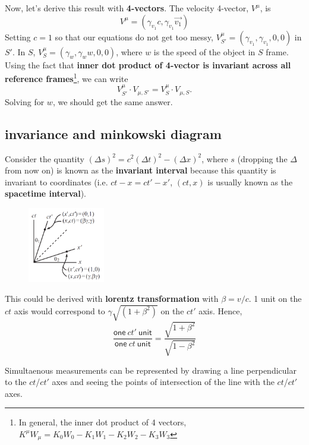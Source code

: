 Now, let's derive this result with \textbf{4-vectors}. The velocity 4-vector, $V^\mu$, is
\begin{equation}
    V^\mu = (\gamma_{v_1} c, \gamma_{v_1} \vec {v_1})
\end{equation}
Setting $c=1$ so that our equations do not get too messy, $V^\mu_{S'}=(\gamma_{v_1}, \gamma_{v_1}, 0,0)$ in $S'$. In $S$, $V^\mu_S = (\gamma_w, \gamma_w w, 0,0)$, where $w$ is the speed of the object in $S$ frame. Using the fact that \textbf{inner dot product of 4-vector is invariant across all reference frames}\footnote{In general, the inner dot product of 4 vectors, $K^\mu W_\mu=K_0W_0-K_1W_1-K_2W_2-K_3W_3$}, we can write
\begin{equation}
    V^\mu_{S'} \cdot V_{\mu,S'} = V^\mu_S \cdot V_{\mu,S}.
\end{equation}
Solving for $w$, we should get the same answer. 

\subsection{invariance and minkowski diagram}
Consider the quantity $(\Delta s)^2= c^2(\Delta t)^2- (\Delta x)^2$, where $s$ (dropping the $\Delta$ from now on) is known as the \textbf{invariant interval} because this quantity is invariant to coordinates (i.e. $ct-x=ct'-x'$, $(ct, x)$ is usually known as the \textbf{spacetime interval}). 

\begin{figure}[H]
    \centering
    \includegraphics[width=0.3\textwidth]{minkowski.png}
\end{figure}
This could be derived with \textbf{lorentz transformation} with $\beta =v/c$. 1 unit on the $ct$ axis would correspond to $\gamma\sqrt{(1+\beta^2)}$ on the $ct'$ axis. Hence,
\begin{equation}
    \frac{\textsf{one} \ ct' \ \textsf{unit}}{\textsf{one} \ ct \ \textsf{unit}}=\frac{\sqrt{1+\beta^2}}{\sqrt{1-\beta^2}}
\end{equation}

Simultaenous measurements can be represented by drawing a line perpendicular to the $ct$/$ct'$ axes and seeing the points of intersection of the line with the $ct$/$ct'$ axes. 

